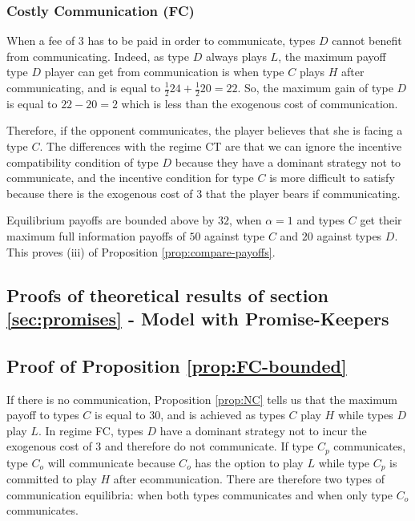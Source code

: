 \documentclass[12pt]{article}
\theoremstyle{break}
\begin{document}
\subsubsection*{Costly Communication (FC)}
When a fee of $3$ has to be paid in order to communicate, types $D$ cannot benefit from communicating. Indeed, as type $D$ always plays $L$, the maximum payoff type $D$ player can get from communication is when type $C$ plays $H$ after communicating, and is equal to $\frac{1}{2}24 +\frac{1}{2}20=22$. So, the maximum gain of type $D$ is equal to $22-20=2$ which is less than the exogenous cost of communication.

Therefore, if the opponent communicates, the player believes that she is facing a type $C$. The differences with the regime CT are that we can ignore the incentive compatibility condition of type $D$ because they have a dominant strategy not to communicate, and the incentive condition for type $C$ is more difficult to satisfy because there is the exogenous cost of $3$ that the player bears if communicating.  


Equilibrium payoffs are bounded above by $32$, when $\alpha=1$ and types $C$ get their maximum full information payoffs of $50$ against type $C$ and $20$ against types $D$. This proves (iii) of Proposition \ref{prop:compare-payoffs}.

%   
%    
\subsection{Proofs of theoretical results of section \ref{sec:promises}  - Model with Promise-Keepers}

\subsection*{Proof of Proposition \ref{prop:FC-bounded}}

	If there is no communication, Proposition \ref{prop:NC} tells us that the maximum payoff to types $C$ is equal to $30$, and is achieved as types $C$ play $H$ while types $D$ play $L$. In regime FC, types $D$ have a dominant strategy not to incur the exogenous cost of $3$ and therefore do not communicate. If type $C_p$ communicates, type $C_o$ will communicate because $C_o$ has the option to play $L$ while type $C_p$ is committed to play $H$ after ecommunication. There are therefore two types of communication equilibria: when both types communicates and when only type $C_o$ communicates. 
	
\end{document}
